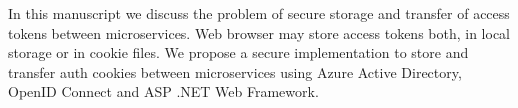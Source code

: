 In this manuscript we discuss the problem of secure storage and transfer of access tokens between microservices.
Web browser may store access tokens both, in local storage or in cookie files.
We propose a secure implementation to store and transfer auth cookies between microservices
using Azure Active Directory, OpenID Connect and ASP .NET Web Framework.
